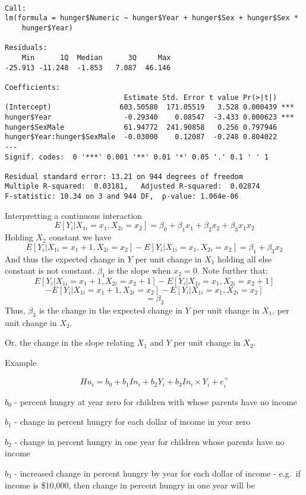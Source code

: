 \documentclass[12pt,openright,oneside,a4paper,chapter=TITLE,section=TITLE,subsection=Title,english,french,spanish,portugues,sumario=tradicional]{04-class-files/abntex2}
\begin{document}
\begin{verbatim}

Call:
lm(formula = hunger$Numeric ~ hunger$Year + hunger$Sex + hunger$Sex * 
    hunger$Year)

Residuals:
    Min      1Q  Median      3Q     Max 
-25.913 -11.248  -1.853   7.087  46.146 

Coefficients:
                            Estimate Std. Error t value Pr(>|t|)    
(Intercept)                603.50580  171.05519   3.528 0.000439 ***
hunger$Year                 -0.29340    0.08547  -3.433 0.000623 ***
hunger$SexMale              61.94772  241.90858   0.256 0.797946    
hunger$Year:hunger$SexMale  -0.03000    0.12087  -0.248 0.804022    
---
Signif. codes:  0 '***' 0.001 '**' 0.01 '*' 0.05 '.' 0.1 ' ' 1

Residual standard error: 13.21 on 944 degrees of freedom
Multiple R-squared:  0.03181,	Adjusted R-squared:  0.02874 
F-statistic: 10.34 on 3 and 944 DF,  p-value: 1.064e-06
\end{verbatim}

Interpretting a continuous interaction
\[
E[Y_i | X_{1i}=x_1, X_{2i}=x_2] = \beta_0 + \beta_1 x_{1} + \beta_2 x_{2} + \beta_3 x_{1}x_{2}
\]
Holding \(X_2\) constant we have
\[
E[Y_i | X_{1i}=x_1+1, X_{2i}=x_2]-E[Y_i | X_{1i}=x_1, X_{2i}=x_2]
= \beta_1 + \beta_3 x_{2} 
\]
And thus the expected change in \(Y\) per unit change in \(X_1\) holding all else constant is not constant. \(\beta_1\) is the slope when \(x_{2} = 0\). Note further that:
\[
E[Y_i | X_{1i}=x_1+1, X_{2i}=x_2+1]-E[Y_i | X_{1i}=x_1, X_{2i}=x_2+1]
\]
\[
-E[Y_i | X_{1i}=x_1+1, X_{2i}=x_2]-E[Y_i | X_{1i}=x_1, X_{2i}=x_2]
\]
\[
=\beta_3  
\]
Thus, \(\beta_3\) is the change in the expected change in \(Y\) per unit change in \(X_1\), per unit change in \(X_2\).

Or, the change in the slope relating \(X_1\) and \(Y\) per unit change in \(X_2\).

Example

\[Hu_i = b_0 + b_1 In_i + b_2 Y_i + b_3 In_i \times Y_i + e^+_i\]

\(b_0\) - percent hungry at year zero for children with whose parents have no income

\(b_1\) - change in percent hungry for each dollar of income in year zero

\(b_2\) - change in percent hungry in one year for children whose parents have no income

\(b_3\) - increased change in percent hungry by year for each dollar of income - e.g.~if income is \$10,000, then change in percent hungry in one year will be
\end{document}
